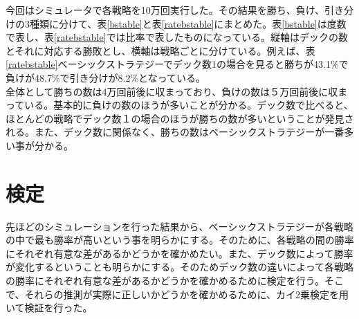 \begin{table}[H]
 \caption{デック数と各戦略での勝利、負け、引き分けの比率\label{ratebstable}}
 \begin{center}
 \end{center}
\end{table}
今回はシミュレータで各戦略を10万回実行した。その結果を勝ち、負け、引き分けの3種類に分けて、表\ref{bstable}と表\ref{ratebstable}にまとめた。表\ref{bstable}は度数で表し、表\ref{ratebstable}では比率で表したものになっている。縦軸はデックの数とそれに対応する勝敗とし、横軸は戦略ごとに分けている。例えば、表\ref{ratebstable}ベーシックストラテジーでデック数1の場合を見ると勝ちが43.1\%で負けが48.7\%で引き分けが8.2\%となっている。\\
全体として勝ちの数は4万回前後に収まっており、負けの数は５万回前後に収まっている。基本的に負けの数のほうが多いことが分かる。デック数で比べると、ほとんどの戦略でデック数１の場合のほうが勝ちの数が多いということが発見される。また、デック数に関係なく、勝ちの数はベーシックストラテジーが一番多い事が分かる。

\section{検定}
先ほどのシミュレーションを行った結果から、ベーシックストラテジーが各戦略の中で最も勝率が高いという事を明らかにする。そのために、各戦略の間の勝率にそれぞれ有意な差があるかどうかを確かめたい。また、デック数によって勝率が変化するということも明らかにする。そのためデック数の違いによって各戦略の勝率にそれぞれ有意な差があるかどうかを確かめるために検定を行う。そこで、それらの推測が実際に正しいかどうかを確かめるために、カイ2乗検定を用いて検証を行った。

